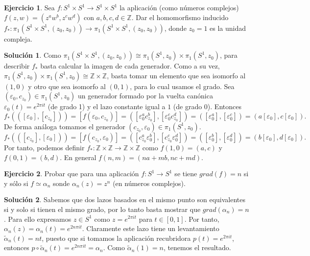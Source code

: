 \documentclass{article}
\theoremstyle{plain}
\theoremstyle{definition}
\newtheorem{exercise}{Ejercicio}
\newtheorem*{sol*}{Solución}
\newcommand{\Z}{\mathbb{Z}}
\begin{document}
\begin{exercise}
\item \label{pl11.n1}
Sea $f:S^1\times S^1 \to S^1 \times S^1$ la aplicaci\'on (como n\'umeros complejos) $f(z,w)=(z^a
w^b,z^c w^d)$ con $a,b,c,d \in \mathbb{Z}$. Dar el homomorfismo inducido
$f_*: \pi_1(S^1\times S^1,(z_0,z_0)) \to \pi_1(S^1\times S^1,(z_0,z_0))$, donde $z_0 = 1$ es la unidad compleja.
\end{exercise}
\begin{sol*}
Como $\pi_1(S^1\times S^1,(z_0,z_0))\cong\pi_1(S^1,z_0)\times\pi_1(S^1,z_0)$, para describir $f_*$ basta calcular la imagen de cada generador. Como a su vez, $\pi_1(S^1,z_0)\times\pi_1(S^1,z_0)\cong\Z\times\Z$, basta tomar un elemento que sea isomorfo al $(1,0)$ y otro que sea isomorfo al $(0,1)$, para lo cual usamos el grado. Sea $(\varepsilon_0,c_{z_0})\in\pi_1(S^1,z_0)$ un generador formado por la vuelta canónica $\varepsilon_0(t)=e^{2\pi it}$ (de grado 1) y el lazo constante igual a $1$ (de grado 0). Entonces
\[
f_*(([\varepsilon_0],[c_{z_0}]))=[f(\varepsilon_0,c_{z_0})]=([\varepsilon_0^a c_{z_0}^b],[\varepsilon_0^c c_{z_0}^d])=([\varepsilon_0^a],[\varepsilon_0^c])=(a[\varepsilon_0],c[\varepsilon_0]).
\]
De forma análoga tomamos el generador $(c_{z_0},\varepsilon_0)\in\pi_1(S^1,z_0)$.
\[
f_*(([c_{z_0}],[\varepsilon_0]))=[f(c_{z_0},\varepsilon_0)]=([c_{z_0}^a \varepsilon_0^b],[c_{z_0}^c\varepsilon_0^d])=([\varepsilon_0^b],[\varepsilon_0^d])=(b[\varepsilon_0],d[\varepsilon_0]).
\]
Por tanto, podemos definir $f_*:\Z\times\Z\to\Z\times\Z$ como $f(1,0)=(a,c)$ y $f(0,1)=(b,d)$. En general $f(n,m)=(na+mb,nc+md)$.
\end{sol*}

\newpage

\begin{exercise}
Probar que para una aplicaci\'on $f: S^1\to S^1$ se tiene $grad(f) = n$ si y s\'olo si $f\simeq \alpha_n$ sonde
$\alpha_n(z) = z^n$ (en n\'umeros complejos).
\end{exercise}
\begin{sol*}
Sabemos que dos lazos basados en el mismo punto son equivalentes si y solo si tienen el mismo grado, por lo tanto basta mostrar que $grad(\alpha_n)=n$. Para ello expresamos $z\in S^1$ como $z=e^{2\pi it}$ para $t\in[0,1]$. Por tanto, $\alpha_n(z)=\alpha_n(t)=e^{2n\pi i t}$. Claramente este lazo tiene un levantamiento $\tilde{\alpha}_n(t)=nt$, puesto que si tomamos la aplicación recubridora $p(t)=e^{2\pi it}$, entonces $p\circ\tilde{\alpha}_n(t)=e^{2n\pi it}=\alpha_n$. Como $\tilde{\alpha}_n(1)=n$, tenemos el resultado.
\end{sol*}
\newpage
\end{document}
